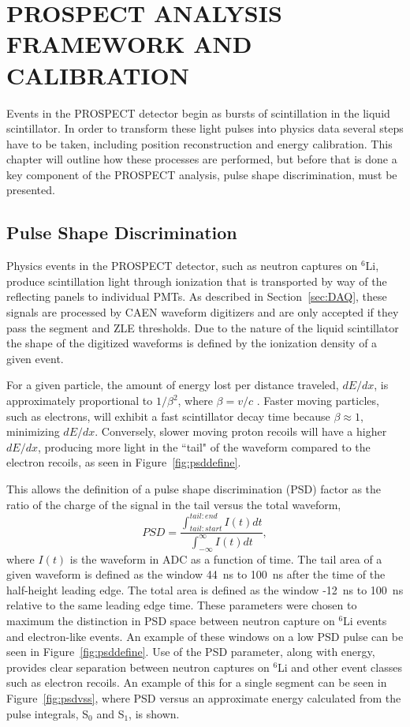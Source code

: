 \chapter{\uppercase{PROSPECT Analysis Framework and Calibration}}

Events in the PROSPECT detector begin as bursts of scintillation in the liquid scintillator. 
In order to transform these light pulses into physics data several steps have to be taken, including position reconstruction and energy calibration. 
This chapter will outline how these processes are performed, but before that is done a key component of the PROSPECT analysis, pulse shape discrimination, must be presented.

\section{Pulse Shape Discrimination}

Physics events in the PROSPECT detector, such as neutron captures on $^6$Li, produce scintillation light through ionization that is transported by way of the reflecting panels to individual PMTs. 
As described in Section~\ref{sec:DAQ}, these signals are processed by CAEN waveform digitizers and are only accepted if they pass the segment and ZLE thresholds.
Due to the nature of the liquid scintillator the shape of the digitized waveforms is defined by the ionization density of a given event.

For a given particle, the amount of energy lost per distance traveled, $dE/dx$, is approximately proportional to $1/\beta^2$, where $\beta = v/c$ \cite{PDG}.
Faster moving particles, such as electrons, will exhibit a fast scintillator decay time because $\beta \approx 1$, minimizing $dE/dx$.
Conversely, slower moving proton recoils will have a higher $dE/dx$, producing more light in the ``tail" of the waveform compared to the electron recoils, as seen in Figure~\ref{fig:psddefine}. 

This allows the definition of a pulse shape discrimination (PSD) factor as the ratio of the charge of the signal in the tail versus the total waveform,
\begin{equation}
	PSD =  \frac{\int_{tail:start}^{tail:end}I(t)dt}{\int_{-\infty}^{\infty}I(t)dt},
\end{equation}
where $I(t)$ is the waveform in ADC as a function of time.
The tail area of a given waveform is defined as the window 44~ns to 100~ns after the time of the half-height leading edge. 
The total area is defined as the window -12~ns to 100~ns relative to the same leading edge time. 
These parameters were chosen to maximum the distinction in PSD space between neutron capture on $^6$Li events and electron-like events.
An example of these windows on a low PSD pulse can be seen in Figure~\ref{fig:psddefine}.
Use of the PSD parameter, along with energy, provides clear separation between neutron captures on $^6$Li and other event classes such as electron recoils. 
An example of this for a single segment can be seen in Figure~\ref{fig:psdvss}, where
PSD versus an approximate energy calculated from the pulse integrals, S$_0$ and S$_1$, is shown.

